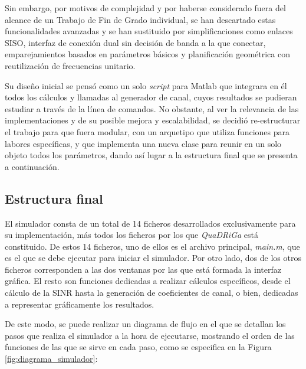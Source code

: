 Sin embargo, por motivos de complejidad y por haberse considerado fuera del alcance de un Trabajo de Fin de Grado individual, se han descartado estas funcionalidades avanzadas y se han sustituido por simplificaciones como enlaces SISO, interfaz de conexión dual sin decisión de banda a la que conectar, emparejamientos basados en parámetros básicos y planificación geométrica con reutilización de frecuencias unitario.

Su diseño inicial se pensó como un solo \textit{script} para Matlab que integrara en él todos los cálculos y llamadas al generador de canal, cuyos resultados se pudieran estudiar a través de la línea de comandos. No obstante, al ver la relevancia de las implementaciones y de su posible mejora y escalabilidad, se decidió re-estructurar el trabajo para que fuera modular, con un arquetipo que utiliza funciones para labores específicas, y que implementa una nueva clase para reunir en un solo objeto todos los parámetros, dando así lugar a la estructura final que se presenta a continuación.

\subsection{Estructura final}

El simulador consta de un total de 14 ficheros desarrollados exclusivamente para su implementación, más todos los ficheros por los que \textit{QuaDRiGa} está constituido. 
De estos 14 ficheros, uno de ellos es el archivo principal, \textit{main.m}, que es el que se debe ejecutar para iniciar el simulador. Por otro lado, dos de los otros ficheros corresponden a las dos ventanas por las que está formada la interfaz gráfica. El resto son funciones dedicadas a realizar cálculos específicos, desde el cálculo de la SINR hasta la generación de coeficientes de canal, o bien, dedicadas a representar gráficamente los resultados.

De este modo, se puede realizar un diagrama de flujo en el que se detallan los pasos que realiza el simulador a la hora de ejecutarse, mostrando el orden de las funciones de las que se sirve en cada paso, como se especifica en la Figura \ref{fig:diagrama_simulador}:

